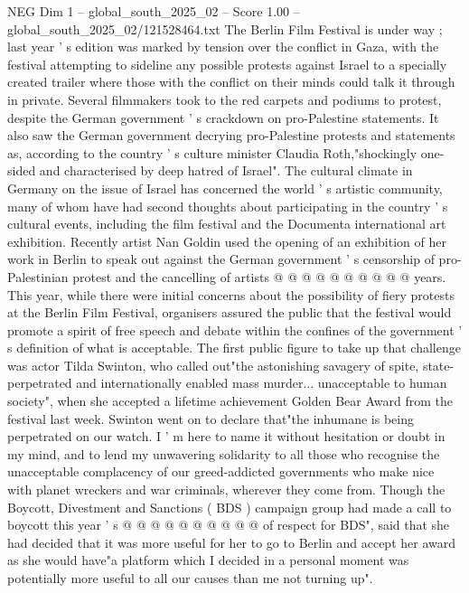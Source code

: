 \begin{textsample}{NEG Dim 1 – global\_south\_2025\_02 – Score 1.00 – global\_south\_2025\_02/121528464.txt}  \label{ex:f1_neg_033}
The Berlin Film Festival is under way ; last year ' s edition was marked by tension over the conflict in Gaza, with the festival attempting to sideline any possible protests against Israel to a specially created trailer where those with the conflict on their minds could talk it through in private.
Several filmmakers took to the red carpets and podiums to protest, despite the German government ' s crackdown on pro-Palestine statements.
It also saw the German government decrying pro-Palestine protests and statements as, according to the country ' s culture minister Claudia Roth,"shockingly one-sided and characterised by deep hatred of Israel".
The cultural climate in Germany on the issue of Israel has concerned the world ' s artistic community, many of whom have had second thoughts about participating in the country ' s cultural events, including the film festival and the Documenta international art exhibition.
Recently artist Nan Goldin used the opening of an exhibition of her work in Berlin to speak out against the German government ' s censorship of pro-Palestinian protest and the cancelling of artists @ @ @ @ @ @ @ @ @ @ years.
This year, while there were initial concerns about the possibility of fiery protests at the Berlin Film Festival, organisers assured the public that the festival would promote a spirit of free speech and debate within the confines of the government ' s definition of what is acceptable.
The first public figure to take up that challenge was actor Tilda Swinton, who called out"the astonishing savagery of spite, state-perpetrated and internationally enabled mass murder... unacceptable to human society", when she accepted a lifetime achievement Golden Bear Award from the festival last week.
Swinton went on to declare that"the inhumane is being perpetrated on our watch.
I ' m here to name it without hesitation or doubt in my mind, and to lend my unwavering solidarity to all those who recognise the unacceptable complacency of our greed-addicted governments who make nice with planet wreckers and war criminals, wherever they come from.
Though the Boycott, Divestment and Sanctions ( BDS ) campaign group had made a call to boycott this year ' s @ @ @ @ @ @ @ @ @ @ of respect for BDS", said that she had decided that it was more useful for her to go to Berlin and accept her award as she would have"a platform which I decided in a personal moment was potentially more useful to all our causes than me not turning up".

\end{textsample}
